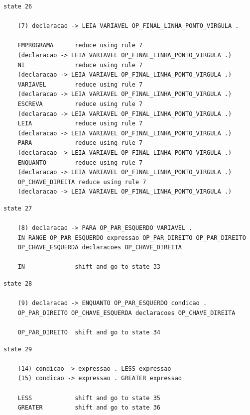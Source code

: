 \documentclass[a4paper,12pt]{article}
\begin{document}
\begin{verbatim}
state 26

    (7) declaracao -> LEIA VARIAVEL OP_FINAL_LINHA_PONTO_VIRGULA .

    FMPROGRAMA      reduce using rule 7 
    (declaracao -> LEIA VARIAVEL OP_FINAL_LINHA_PONTO_VIRGULA .)
    NI              reduce using rule 7 
    (declaracao -> LEIA VARIAVEL OP_FINAL_LINHA_PONTO_VIRGULA .)
    VARIAVEL        reduce using rule 7 
    (declaracao -> LEIA VARIAVEL OP_FINAL_LINHA_PONTO_VIRGULA .)
    ESCREVA         reduce using rule 7 
    (declaracao -> LEIA VARIAVEL OP_FINAL_LINHA_PONTO_VIRGULA .)
    LEIA            reduce using rule 7 
    (declaracao -> LEIA VARIAVEL OP_FINAL_LINHA_PONTO_VIRGULA .)
    PARA            reduce using rule 7 
    (declaracao -> LEIA VARIAVEL OP_FINAL_LINHA_PONTO_VIRGULA .)
    ENQUANTO        reduce using rule 7 
    (declaracao -> LEIA VARIAVEL OP_FINAL_LINHA_PONTO_VIRGULA .)
    OP_CHAVE_DIREITA reduce using rule 7 
    (declaracao -> LEIA VARIAVEL OP_FINAL_LINHA_PONTO_VIRGULA .)

\end{verbatim}

\begin{verbatim}
state 27

    (8) declaracao -> PARA OP_PAR_ESQUERDO VARIAVEL . 
    IN RANGE OP_PAR_ESQUERDO expressao OP_PAR_DIREITO OP_PAR_DIREITO 
    OP_CHAVE_ESQUERDA declaracoes OP_CHAVE_DIREITA

    IN              shift and go to state 33

\end{verbatim}

\begin{verbatim}
state 28

    (9) declaracao -> ENQUANTO OP_PAR_ESQUERDO condicao . 
    OP_PAR_DIREITO OP_CHAVE_ESQUERDA declaracoes OP_CHAVE_DIREITA

    OP_PAR_DIREITO  shift and go to state 34

\end{verbatim}

\begin{verbatim}
state 29

    (14) condicao -> expressao . LESS expressao
    (15) condicao -> expressao . GREATER expressao

    LESS            shift and go to state 35
    GREATER         shift and go to state 36

\end{verbatim}
\end{document}

